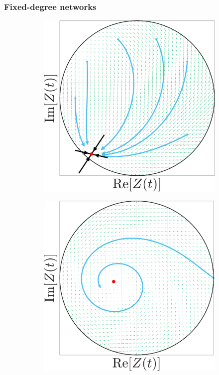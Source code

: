 \begin{frame}
\frametitle{Fixed-degree networks}
\begin{figure}[H]
\centering
\begin{subfigure}[b]{0.32\linewidth}
   \centering
  \includegraphics[width=\linewidth]{../Figures/PhaseSpace/MFRPSR.pdf}
   \label{fig:MFRPSR} 
\end{subfigure} \hfill
\begin{subfigure}[b]{0.32\linewidth}
   \centering
  \includegraphics[width=\linewidth]{../Figures/PhaseSpace/MFRPSS.pdf}

\end{subfigure}
\end{figure}
\end{frame}
